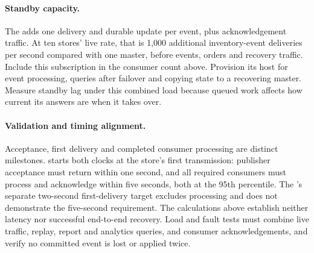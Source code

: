 \paragraph{Standby capacity.}
The \StandbyMaster adds one delivery and durable update per event, plus acknowledgement traffic.
At ten stores' live rate, that is 1{,}000 additional inventory-event deliveries per
second compared with one master, before \DC events, orders and recovery traffic.
Include this subscription in the consumer count above. Provision its host for event
processing, queries after failover and copying state to a recovering master.
Measure standby lag under this combined load because queued work affects how current
its answers are when it takes over.

\paragraph{Validation and timing alignment.}
Acceptance, first delivery and completed consumer processing are distinct milestones.
 starts both clocks at the store's first transmission: publisher
acceptance must return within one second, and all required consumers must process and
acknowledge within five seconds, both at the 95th percentile. The \IEP's separate
two-second first-delivery target excludes processing and does not demonstrate the
five-second requirement. The calculations above establish neither latency nor successful
end-to-end recovery. Load and fault
tests must combine live traffic, replay, report and analytics queries, and consumer acknowledgements,
and verify no committed event is lost or applied twice.
